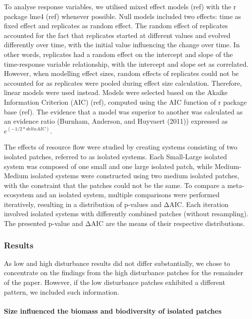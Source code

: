 \documentclass[
]{article}
\begin{document}
To analyse response variables, we utilised mixed effect models (ref)
with the r package lme4 (ref) whenever possible. Null models included
two effects: time as fixed effect and replicates as random effect. The
random effect of replicates accounted for the fact that replicates
started at different values and evolved differently over time, with the
initial value influencing the change over time. In other words,
replicates had a random effect on the intercept and slope of the
time-response variable relationship, with the intercept and slope set as
correlated. However, when modelling effect sizes, random effects of
replicates could not be accounted for as replicates were pooled during
effect size calculation. Therefore, linear models were used instead.
Models were selected based on the Akaike Information Criterion (AIC)
(ref), computed using the AIC function of r package base (ref). The
evidence that a model was superior to another was calculated as an
evidence ratio (Burnham, Anderson, and Huyvaert (2011)) expressed as
\(e^(-1/2 * deltaAIC)\).

The effects of resource flow were studied by creating systems consisting
of two isolated patches, referred to as isolated systems. Each
Small-Large isolated system was composed of one small and one large
isolated patch, while Medium-Medium isolated systems were constructed
using two medium isolated patches, with the constraint that the patches
could not be the same. To compare a meta-ecosystem and an isolated
system, multiple comparisons were performed iteratively, resulting in a
distribution of p-values and ΔAIC. Each iteration involved isolated
systems with differently combined patches (without resampling). The
presented p-value and ΔAIC are the means of their respective
distributions.

\hypertarget{results}{%
\subsubsection{Results}\label{results}}

As low and high disturbance results did not differ substantially, we
chose to concentrate on the findings from the high disturbance patches
for the remainder of the paper. However, if the low disturbance patches
exhibited a different pattern, we included such information.

\hypertarget{size-influenced-the-biomass-and-biodiversity-of-isolated-patches}{%
\paragraph{Size influenced the biomass and biodiversity of isolated
patches}\label{size-influenced-the-biomass-and-biodiversity-of-isolated-patches}}
\end{document}
